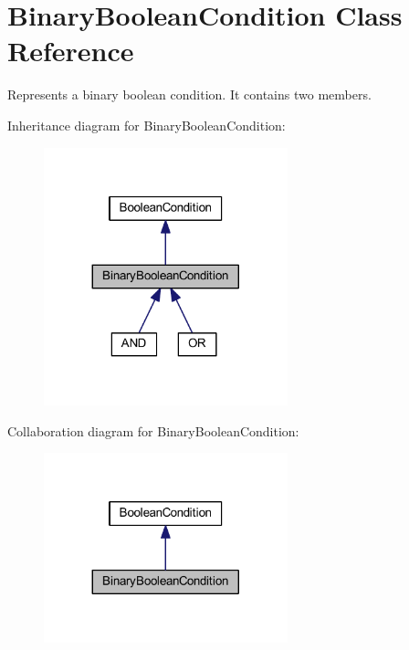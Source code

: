 \hypertarget{class_binary_boolean_condition}{\section{Binary\-Boolean\-Condition Class Reference}
\label{class_binary_boolean_condition}
}


Represents a binary boolean condition. It contains two members.  




Inheritance diagram for Binary\-Boolean\-Condition\-:\nopagebreak
\begin{figure}[H]
\begin{center}
\leavevmode
\includegraphics[width=200pt]{class_binary_boolean_condition__inherit__graph}
\end{center}
\end{figure}


Collaboration diagram for Binary\-Boolean\-Condition\-:\nopagebreak
\begin{figure}[H]
\begin{center}
\leavevmode
\includegraphics[width=200pt]{class_binary_boolean_condition__coll__graph}
\end{center}
\end{figure}
